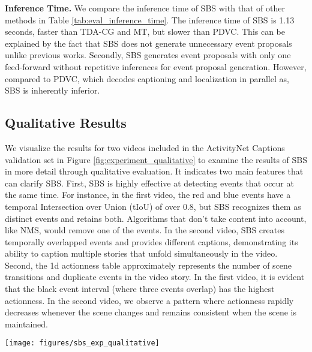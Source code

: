 \textbf{Inference Time.}
We compare the inference time of SBS with that of other methods in Table \ref{tab:eval_inference_time}.
The inference time of SBS is 1.13 seconds, faster than TDA-CG and MT, but slower than PDVC.
This can be explained by the fact that SBS does not generate unnecessary event proposals unlike previous works.
Secondly, SBS generates event proposals with only one feed-forward without repetitive inferences for event proposal generation.
However, compared to PDVC, which decodes captioning and localization in parallel as, SBS is inherently inferior.

\subsection{Qualitative Results}
\label{subsec:exp_qualitative}

We visualize the results for two videos included in the ActivityNet Captions validation set in Figure \ref{fig:experiment_qualitative} to examine the results of SBS in more detail through qualitative evaluation.
It indicates two main features that can clarify SBS.
First, SBS is highly effective at detecting events that occur at the same time.
For instance, in the first video, the red and blue events have a temporal Intersection over Union (tIoU) of over 0.8, but SBS recognizes them as distinct events and retains both. Algorithms that don't take content into account, like NMS, would remove one of the events.
In the second video, SBS creates temporally overlapped events and provides different captions, demonstrating its ability to caption multiple stories that unfold simultaneously in the video.
Second, the 1d actionness table approximately represents the number of scene transitions and duplicate events in the video story.
In the first video, it is evident that the black event interval (where three events overlap) has the highest actionness.
In the second video, we observe a pattern where actionness rapidly decreases whenever the scene changes and remains consistent when the scene is maintained.

\begin{figure*}[t]
  \centering
  \texttt{[image: figures/sbs\_exp\_qualitative]}
  \caption{
    Examples of qualitative result on the ActivityNet Captions dataset.
    Sentences corresponding to the event are matched with the same color.
    We also show the 1D actionness table obtained from the event counter table.
  }
  \label{fig:experiment_qualitative}
\end{figure*}


